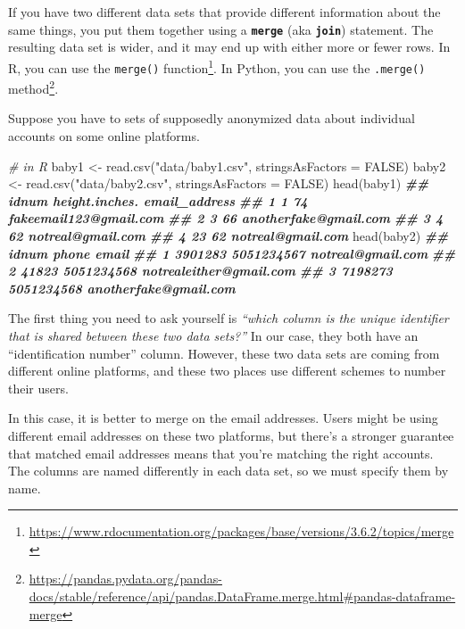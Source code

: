 \documentclass[
  12pt,
  krantz2]{krantz}
\makeatletter
\newenvironment{Shaded}{\begin{snugshade}}{\end{snugshade}}
\newcommand{\AttributeTok}[1]{\textcolor[rgb]{0.61,0.61,0.61}{#1}}
\newcommand{\CommentTok}[1]{\textcolor[rgb]{0.37,0.37,0.37}{\textit{#1}}}
\newcommand{\ConstantTok}[1]{\textcolor[rgb]{0,0,0}{#1}}
\newcommand{\DocumentationTok}[1]{\textcolor[rgb]{0.37,0.37,0.37}{\textbf{\textit{#1}}}}
\newcommand{\FunctionTok}[1]{\textcolor[rgb]{0,0,0}{#1}}
\newcommand{\NormalTok}[1]{#1}
\newcommand{\OtherTok}[1]{\textcolor[rgb]{0.37,0.37,0.37}{#1}}
\newcommand{\StringTok}[1]{\textcolor[rgb]{0.5,0.5,0.5}{#1}}
\renewcommand{\href}[2]{#2\footnote{\url{#1}}}
\newenvironment{kframe}{%
\medskip{}
\setlength{\fboxsep}{.8em}
 \def\at@end@of@kframe{}%
 \ifinner\ifhmode%
  \def\at@end@of@kframe{\end{minipage}}%
  \begin{minipage}{\columnwidth}%
 \fi\fi%
 \def\FrameCommand##1{\hskip\@totalleftmargin \hskip-\fboxsep
 \colorbox{shadecolor}{##1}\hskip-\fboxsep
     \hskip-\linewidth \hskip-\@totalleftmargin \hskip\columnwidth}%
 \MakeFramed {\advance\hsize-\width
   \@totalleftmargin\z@ \linewidth\hsize
   \@setminipage}}%
 {\par\unskip\endMakeFramed%
 \at@end@of@kframe}
\renewenvironment{Shaded}{\begin{kframe}}{\end{kframe}}
\makeatother
\begin{document}
If you have two different data sets that provide different information about the same things, you put them together using a \textbf{\texttt{merge}} (aka \textbf{\texttt{join}}) statement. The resulting data set is wider, and it may end up with either more or fewer rows. In R, you can use the \href{https://www.rdocumentation.org/packages/base/versions/3.6.2/topics/merge}{\texttt{merge()} function}. In Python, you can use the \href{https://pandas.pydata.org/pandas-docs/stable/reference/api/pandas.DataFrame.merge.html\#pandas-dataframe-merge}{\texttt{.merge()} method}.

Suppose you have to sets of supposedly anonymized data about individual accounts on some online platforms.

\begin{Shaded}
\begin{Highlighting}[]
\CommentTok{\# in R}
\NormalTok{baby1 }\OtherTok{\textless{}{-}} \FunctionTok{read.csv}\NormalTok{(}\StringTok{"data/baby1.csv"}\NormalTok{, }\AttributeTok{stringsAsFactors =} \ConstantTok{FALSE}\NormalTok{)}
\NormalTok{baby2 }\OtherTok{\textless{}{-}} \FunctionTok{read.csv}\NormalTok{(}\StringTok{"data/baby2.csv"}\NormalTok{, }\AttributeTok{stringsAsFactors =} \ConstantTok{FALSE}\NormalTok{)}
\FunctionTok{head}\NormalTok{(baby1)}
\DocumentationTok{\#\#   idnum height.inches.          email\_address}
\DocumentationTok{\#\# 1     1             74 fakeemail123@gmail.com}
\DocumentationTok{\#\# 2     3             66  anotherfake@gmail.com}
\DocumentationTok{\#\# 3     4             62      notreal@gmail.com}
\DocumentationTok{\#\# 4    23             62      notreal@gmail.com}
\FunctionTok{head}\NormalTok{(baby2)}
\DocumentationTok{\#\#     idnum      phone                   email}
\DocumentationTok{\#\# 1 3901283 5051234567       notreal@gmail.com}
\DocumentationTok{\#\# 2   41823 5051234568 notrealeither@gmail.com}
\DocumentationTok{\#\# 3 7198273 5051234568   anotherfake@gmail.com}
\end{Highlighting}
\end{Shaded}

The first thing you need to ask yourself is \emph{``which column is the unique identifier that is shared between these two data sets?''} In our case, they both have an ``identification number'' column. However, these two data sets are coming from different online platforms, and these two places use different schemes to number their users.

In this case, it is better to merge on the email addresses. Users might be using different email addresses on these two platforms, but there's a stronger guarantee that matched email addresses means that you're matching the right accounts. The columns are named differently in each data set, so we must specify them by name.
\end{document}
